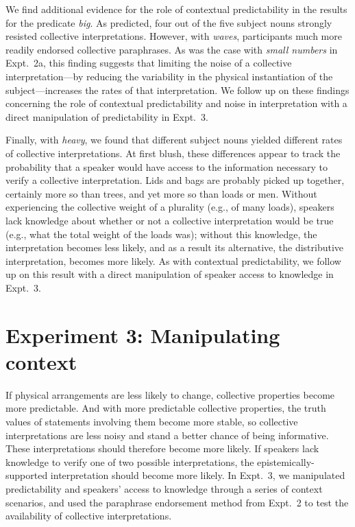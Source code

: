 \documentclass[linguex]{sp}
\begin{document}
We find additional evidence for the role of contextual predictability in the results for the predicate \emph{big}. As predicted, four out of the five subject nouns strongly resisted collective interpretations. However, with \emph{waves}, participants much more readily endorsed collective paraphrases. As was the case with \emph{small numbers} in Expt.~2a, this finding suggests that limiting the noise of a collective interpretation---by reducing the variability in the physical instantiation of the subject---increases the rates of that interpretation. We follow up on these findings concerning the role of contextual predictability and noise in interpretation with a direct manipulation of predictability in Expt.~3.

Finally, with \emph{heavy}, we found that different subject nouns yielded different rates of collective interpretations. At first blush, these differences appear to track the probability that a speaker would have access to the information necessary to verify a collective interpretation. Lids and bags are probably picked up together, certainly more so than trees, and yet more so than loads or men. Without experiencing the collective weight of a plurality (e.g., of many loads), speakers lack knowledge about whether or not a collective interpretation would be true (e.g., what the total weight of the loads was); without this knowledge, the interpretation becomes less likely, and as a result its alternative, the distributive interpretation, becomes more likely. As with contextual predictability, we follow up on this result with a direct manipulation of speaker access to knowledge in Expt.~3.


\section{Experiment 3: Manipulating context}

If physical arrangements are less likely to change, collective properties become more predictable. And with more predictable collective properties, the truth values of statements involving them become more stable, so collective interpretations are less noisy and stand a better chance of being informative. These interpretations should therefore become more likely. If speakers lack knowledge to verify one of two possible interpretations, the epistemically-supported interpretation should become more likely. In Expt.~3, we manipulated predictability and speakers' access to knowledge through a series of context scenarios, and used the paraphrase endorsement method from Expt.~2 to test the availability of collective interpretations.
\end{document}
